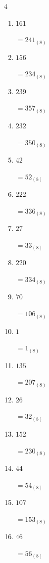 \begin{multicols}{4}
\begin{enumerate}
        $=361_{(8)}$

  \item $161$

        $=241_{(8)}$

  \item $156$

        $=234_{(8)}$

  \item $239$

        $=357_{(8)}$

  \item $232$

        $=350_{(8)}$

\columnbreak %

  \item $42$

        $=52_{(8)}$

  \item $222$

        $=336_{(8)}$

  \item $27$

        $=33_{(8)}$

  \item $220$

        $=334_{(8)}$

  \item $70$

        $=106_{(8)}$

  \item $1$

        $=1_{(8)}$

  \item $135$

        $=207_{(8)}$

  \item $26$

        $=32_{(8)}$

  \item $152$

        $=230_{(8)}$

  \item $44$

        $=54_{(8)}$

  \item $107$

        $=153_{(8)}$

  \item $46$

        $=56_{(8)}$


\end{enumerate}
\end{multicols}
